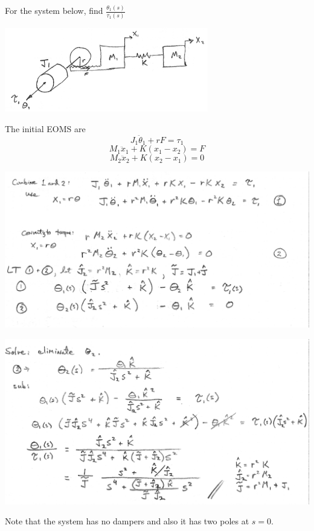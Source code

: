 \begin{Example}
For the system below, find  $\frac{\theta_1(s)}{\tau_1(s)}$

\includegraphics[width=3.5in]{figs03/00754a.png}

The initial EOMS are
\[
J_1\ddot{\theta}_1 + rF = \tau_1
\]
\[
M_1\ddot{x}_1 + K(x_1-x_2) = F
\]
\[
M_2\ddot{x}_2+K(x_2-x_1)  = 0
\]

\includegraphics[width=6.0in]{figs03/00756aa.png}
%
%

\includegraphics[width=6.0in]{figs03/00756ba.png}

Note that the system has no dampers and also it has two poles at $s=0$.

\end{Example}


